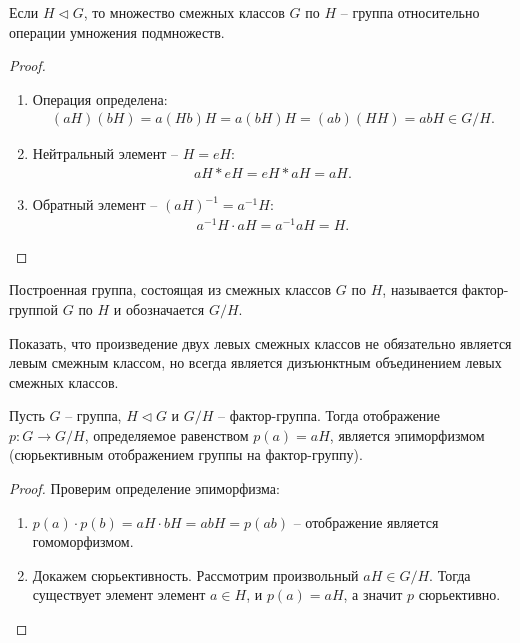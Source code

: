 \begin{theorem}
    \label{th2.2}
    Если $H \vartriangleleft G$, то множество смежных классов $G$ по $H$ -- группа относительно 
    операции умножения подмножеств.
\end{theorem}

\begin{proof}~
    \begin{enumerate}
        \item Операция определена:
        \begin{gather*}
            (aH)(bH) = a(Hb)H = a(bH)H = (ab)(HH) = abH \in G/H.
        \end{gather*}
        \item Нейтральный элемент -- $H = eH$:
        \begin{gather*}
            aH * eH = eH * aH = aH.
        \end{gather*}
        \item Обратный элемент -- $(aH)^{-1} = a^{-1}H$:
        \begin{gather*}
            a^{-1}H \cdot aH = a^{-1}aH = H.
        \end{gather*}
    \end{enumerate}
\end{proof}

\begin{definition}
    Построенная группа, состоящая из смежных классов $G$ по $H$, называется фактор-группой $G$ по $H$ 
    и обозначается $G/H$.
\end{definition}

\begin{exercise}
    Показать, что произведение двух левых смежных классов не обязательно является левым смежным 
    классом, но всегда является дизъюнктным объединением левых смежных классов.
\end{exercise}

\begin{proposition}
    \label{pr3.2}
    Пусть $G$ -- группа, $H \vartriangleleft G$ и $G/H$ -- фактор-группа. Тогда отображение 
    $p: G \to G/H$, определяемое равенством $p(a) = aH$, является эпиморфизмом (сюрьективным 
    отображением группы на фактор-группу).
\end{proposition}

\begin{proof}
    Проверим определение эпиморфизма:
    \begin{enumerate}
        \item $p(a) \cdot p(b) = aH \cdot bH = abH = p(ab)$ -- отображение является гомоморфизмом.
        \item Докажем сюрьективность. Рассмотрим произвольный $aH \in G/H$. Тогда существует элемент  
        элемент $a \in H$, и $p(a) = aH$, а значит $p$ сюрьективно.
    \end{enumerate}
\end{proof}

